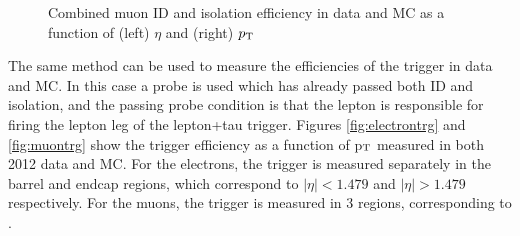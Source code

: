 \begin{figure}[h!]
\caption{Combined muon ID and isolation efficiency in data and MC as a function
of (left) $\eta$ and (right) $p_{\mathrm{T}}$}
\label{fig:muonIdIso}
\end{figure}

\noindent The same method can be used to measure the efficiencies of the trigger
in data and MC. In this case a probe is used which has already passed both ID
and isolation, and the passing probe condition is that the lepton is responsible
for firing the lepton leg of the lepton+tau trigger. Figures
\ref{fig:electrontrg} and \ref{fig:muontrg} show the trigger efficiency as a
function of p$_{\rm{T}}$ measured in both 2012 data and MC. For the
electrons, the trigger is measured separately in the barrel and endcap
regions, which correspond to $|\eta| < 1.479$ and $|\eta| > 1.479$
respectively. For the muons, the trigger is measured in 3 regions, corresponding
to .

